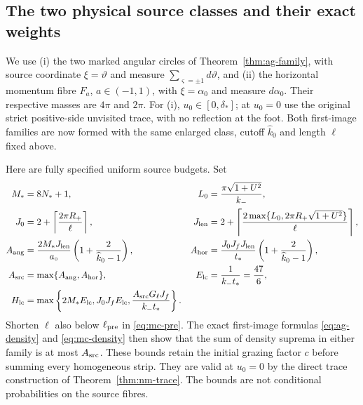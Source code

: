 \subsection{The two physical source classes and their exact weights}

We use (i) the two marked angular circles of
Theorem~\ref{thm:ag-family}, with source coordinate $\xi=\vartheta$
and measure $\sum_{\varsigma=\pm1}d\vartheta$, and (ii) the horizontal
momentum fibre $F_a$, $a\in(-1,1)$, with $\xi=\alpha_0$ and measure
$d\alpha_0$.  Their respective masses are $4\pi$ and $2\pi$.
For (i), $u_0\in[0,\delta_*]$; at $u_0=0$ use the original strict
positive-side unvisited trace, with no reflection at the foot.
Both first-image families are now formed with the same enlarged
class, cutoff $\widehat k_0$ and length $\ell$ fixed above.

Here are fully specified uniform source budgets.  Set
\begin{align}
 M_*&=8N_*+1,&
 L_0&=\frac{\pi\sqrt{1+U^2}}{k_-},\notag\\
 J_0&=2+\left\lceil\frac{2\pi R_+}{\ell}\right\rceil,&
 J_{\rm len}&=2+\left\lceil
   \frac{2\max\{L_0,2\pi R_+\sqrt{1+U^2}\}}{\ell}\right\rceil,
                                                    \label{eq:lc-source-counts}\\
 A_{\rm ang}&=\frac{2M_*J_{\rm len}}{a_\circ}
                  \left(1+\frac2{\widehat k_0-1}\right),&
 A_{\rm hor}&=\frac{J_0J_fJ_{\rm len}}{t_*}
                  \left(1+\frac2{\widehat k_0-1}\right),\notag\\
 A_{\rm src}&=\max\{A_{\rm ang},A_{\rm hor}\},&
 E_{\rm lc}&=\frac1{k_-t_*}=\frac{47}{6},\notag\\
 H_{\rm lc}&=\max\left\{2M_*E_{\rm lc},J_0J_fE_{\rm lc},
                  \frac{A_{\rm src}G_\ell J_f}{k_-t_*}\right\}.
                                                    \label{eq:lc-source-budgets}
\end{align}
Shorten $\ell$ also below $\ell_{\rm pre}$ in \eqref{eq:mc-pre}.
The exact first-image formulas \eqref{eq:ag-density} and
\eqref{eq:mc-density} then show that the sum of density suprema in
either family is at most $A_{\rm src}$.  These bounds retain the
initial grazing factor $c$ before summing every homogeneous strip.
They are valid at $u_0=0$ by the direct trace construction of
Theorem~\ref{thm:nm-trace}.  The bounds are not conditional
probabilities on the source fibres.

